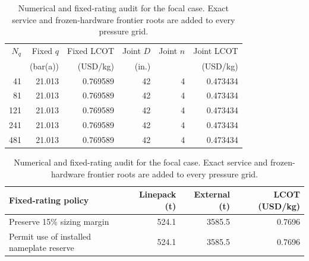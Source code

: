 \begin{table}[!t]
\centering
\caption{Numerical and fixed-rating audit for the focal case. Exact service and frozen-hardware frontier roots are added to every pressure grid.}
\label{tab:buffer_design_numerical_audit_si}
\small
\begin{tabular}{rrrrrr}
\toprule
$N_q$ & Fixed $q$ & Fixed LCOT & Joint $D$ & Joint $n$ & Joint LCOT \\
 & (bar(a)) & (USD/kg) & (in.) &  & (USD/kg) \\
\midrule
41 & 21.013 & 0.769589 & 42 & 4 & 0.473434 \\
81 & 21.013 & 0.769589 & 42 & 4 & 0.473434 \\
121 & 21.013 & 0.769589 & 42 & 4 & 0.473434 \\
241 & 21.013 & 0.769589 & 42 & 4 & 0.473434 \\
481 & 21.013 & 0.769589 & 42 & 4 & 0.473434 \\
\bottomrule
\end{tabular}
\vspace{3pt}
\begin{tabular}{lrrr}
\toprule
Fixed-rating policy & Linepack (t) & External (t) & LCOT (USD/kg) \\
\midrule
Preserve 15\% sizing margin & 524.1 & 3585.5 & 0.7696 \\
Permit use of installed nameplate reserve & 524.1 & 3585.5 & 0.7696 \\
\bottomrule
\end{tabular}
\end{table}
